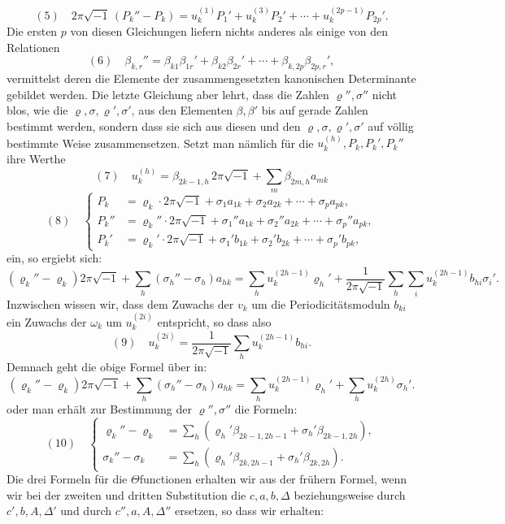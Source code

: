 \documentclass[10pt]{article}
\begin{document}
\[
(5)\quad
2\pi\sqrt{-1}\,(P_k''-P_k)
=u_k^{(1)}P_1'+u_k^{(3)}P_2'+\cdots+u_k^{(2p-1)}P_{2p}'.
\]
Die ersten \(p\) von diesen Gleichungen liefern nichts anderes als einige von den Relationen
\[
(6)\quad
\beta_{k,r}''=\beta_{k1}\beta_{1r}'+\beta_{k2}\beta_{2r}'+\cdots+\beta_{k,2p}\beta_{2p,r}',
\]
vermittelst deren die Elemente der zusammengesetzten kanonischen Determinante gebildet werden. Die letzte Gleichung aber lehrt, dass die Zahlen \(\varrho'',\sigma''\) nicht blos, wie die \(\varrho,\sigma,\varrho',\sigma'\), aus den Elementen \(\beta,\beta'\) bis auf gerade Zahlen bestimmt werden, sondern dass sie sich aus diesen und den \(\varrho,\sigma,\varrho',\sigma'\) auf völlig bestimmte Weise zusammensetzen. Setzt man nämlich für die \(u_k^{(h)},P_k,P_k',P_k''\) ihre Werthe
\[
(7)\quad
u_k^{(h)}=\beta_{2k-1,h}\,2\pi\sqrt{-1}+\sum_m\beta_{2m,h}a_{mk}
\]
\[
(8)\quad
\left\{\begin{aligned}
P_k&=\varrho_k\cdot2\pi\sqrt{-1}+\sigma_1a_{1k}+\sigma_2a_{2k}+\cdots+\sigma_pa_{pk},\\
P_k''&=\varrho_k''\cdot2\pi\sqrt{-1}+\sigma_1''a_{1k}+\sigma_2''a_{2k}+\cdots+\sigma_p''a_{pk},\\
P_k'&=\varrho_k'\cdot2\pi\sqrt{-1}+\sigma_1'b_{1k}+\sigma_2'b_{2k}+\cdots+\sigma_p'b_{pk},
\end{aligned}\right.
\]
ein, so ergiebt sich:
\[
(\varrho_k''-\varrho_k)2\pi\sqrt{-1}+\sum_h(\sigma_h''-\sigma_h)a_{hk}
=\sum_h u_k^{(2h-1)}\varrho_h'
+\frac{1}{2\pi\sqrt{-1}}\sum_h\sum_i u_k^{(2h-1)}b_{hi}\sigma_i'.
\]
Inzwischen wissen wir, dass dem Zuwachs der \(v_k\) um die Periodicitätsmoduln \(b_{ki}\) ein Zuwachs der \(\omega_k\) um \(u_k^{(2i)}\) entspricht, so dass also
\[
(9)\quad
u_k^{(2i)}=\frac{1}{2\pi\sqrt{-1}}\sum_hu_k^{(2h-1)}b_{hi}.
\]
Demnach geht die obige Formel über in:
\[
(\varrho_k''-\varrho_k)2\pi\sqrt{-1}+\sum_h(\sigma_h''-\sigma_h)a_{hk}
=\sum_hu_k^{(2h-1)}\varrho_h'+\sum_hu_k^{(2h)}\sigma_h'.
\]
oder man erhält zur Bestimmung der \(\varrho'',\sigma''\) die Formeln:
\[
(10)\quad
\left\{\begin{aligned}
\varrho_k''-\varrho_k&=\sum_h(\varrho_h'\beta_{2k-1,2h-1}+\sigma_h'\beta_{2k-1,2h}),\\
\sigma_k''-\sigma_k&=\sum_h(\varrho_h'\beta_{2k,2h-1}+\sigma_h'\beta_{2k,2h}).
\end{aligned}\right.
\]
Die drei Formeln für die \(\Theta\)functionen erhalten wir aus der frühern Formel, wenn wir bei der zweiten und dritten Substitution die \(c,a,b,\Delta\) beziehungsweise durch \(c',b,A,\Delta'\) und durch \(c'',a,A,\Delta''\) ersetzen, so dass wir erhalten:
\end{document}
